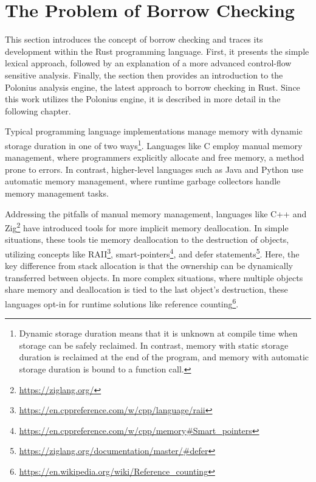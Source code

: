\documentclass[
  11pt,
  twoside,symmetric]{report}
\DeclareRobustCommand{\href}[2]{#2\footnote{\url{#1}}}
\begin{document}
\chapter{The Problem of Borrow
Checking}\label{the-problem-of-borrow-checking}

This section introduces the concept of borrow checking and traces its
development within the Rust programming language. First, it presents the
simple lexical approach, followed by an explanation of a more advanced
control-flow sensitive analysis. Finally, the section then provides an
introduction to the Polonius analysis engine, the latest approach to
borrow checking in Rust. Since this work utilizes the Polonius engine,
it is described in more detail in the following chapter.

Typical programming language implementations manage memory with dynamic
storage duration in one of two ways\footnote{Dynamic storage duration
  means that it is unknown at compile time when storage can be safely
  reclaimed. In contrast, memory with static storage duration is
  reclaimed at the end of the program, and memory with automatic storage
  duration is bound to a function call.}. Languages like C employ manual
memory management, where programmers explicitly allocate and free
memory, a method prone to errors. In
contrast, higher-level languages such as Java and Python use automatic
memory management, where runtime garbage collectors handle memory
management tasks.

Addressing the pitfalls of manual memory management, languages like C++
and \href{https://ziglang.org/}{Zig} have introduced tools for more
implicit memory deallocation. In simple situations, these tools tie
memory deallocation to the destruction of objects, utilizing concepts
like \href{https://en.cppreference.com/w/cpp/language/raii}{RAII},
\href{https://en.cppreference.com/w/cpp/memory\#Smart_pointers}{smart-pointers},
and \href{https://ziglang.org/documentation/master/\#defer}{defer
statements}. Here, the key difference from stack allocation is that the
ownership can be dynamically transferred between objects. In more
complex situations, where multiple objects share memory and deallocation
is tied to the last object's destruction, these languages opt-in for
runtime solutions like
\href{https://en.wikipedia.org/wiki/Reference_counting}{reference
counting}.
\end{document}
